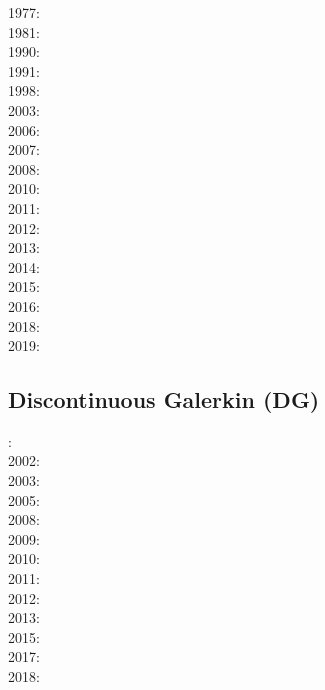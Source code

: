 \noindent
{\scriptsize
1977: \cite{rola77}\\
1981: \cite{dzan81}\\
1990: \cite{lips90}\\
1991: \cite{spak91}\\
1998: \cite{bisp98}\\
2003: \cite{krhh03}\cite{sosi03}\cite{pimo03}\\
2006: \cite{masr06}\\
2007: \cite{mitk07}\cite{lobc07}\cite{rimb07}\\
2008: \cite{zhou08}\cite{zhou08}\\
2010: \cite{dada10}\cite{sifb10}\\
2011: \cite{ridv11}\\
2012: \cite{hawj12}\cite{resa12}\cite{hawj12}\cite{fesw12}\cite{simj12}\\
2013: \cite{ress13}\cite{ebbf13}\cite{davi13}\\
2014: \cite{paml14}\cite{ebbf14}\cite{krbk14}\\
2015: \cite{boem15}\cite{brrs15}\\
2016: \cite{kord16}\cite{moek16}\\
2018: \cite{pabn18}\cite{hamp18}\\
2019: \cite{sopg19}\cite{shar19}
}

\subsection{Discontinuous Galerkin (DG)}

{\scriptsize
{}: \cite{coks00}\\
2002: \cite{cacp02}\cite{coks02}\\
2003: \cite{cock03}\\
2005: \cite{cacs05}\cite{coks05}\\
2008: \cite{kans08}\cite{mofh08}\cite{dole08}\\
2009: \cite{coks09}\cite{cogo09}\\
2010: \cite{ngpc10}\cite{conp10}\cite{mofp10}\\
2011: \cite{geor11}\cite{ngpc11}\\
2012: \cite{kauf12}\cite{ngpe12}\cite[chapt. 31]{lomw12}\\
2013: \cite{vyrc13}\\
2015: \cite{lelk15} \\
2017: \cite{fewk17}\cite{iglo17}\cite{hepb17}\\
2018: \cite{puth18}
}

